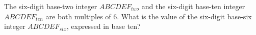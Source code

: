 The six-digit base-two integer $ABCDEF_{two}$ and the six-digit base-ten integer $ABCDEF_{ten}$ are both multiples of $6$. What is the value of the six-digit base-six integer $ABCDEF_{six}$, expressed in base ten?
